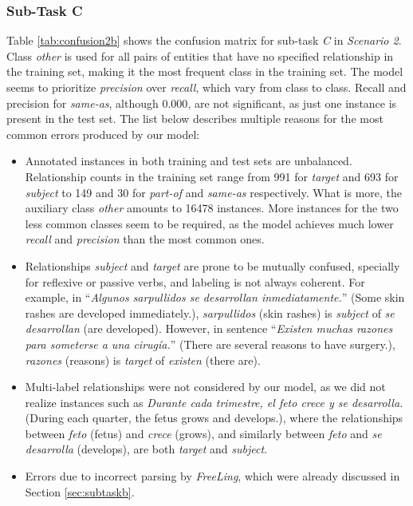 \documentclass[a4paper,11pt,twocolumn,twoside]{article}
\begin{document}
\subsubsection{Sub-Task C}

\label{sec:subtaskc}

Table \ref{tab:confusion2b} shows the confusion matrix for sub-task \emph{C} in \emph{Scenario 2}. Class \emph{other} is used for all pairs of entities that have no specified relationship in the training set, making it the most frequent class in the training set. The model seems to prioritize \emph{precision} over \emph{recall}, which vary from class to class. Recall and precision for \emph{same-as}, although $0.000$, are not significant, as just one instance is present in the test set. The list below describes multiple reasons for the most common errors produced by our model:

\begin{itemize}
    \item Annotated instances in both training and test sets are unbalanced. Relationship counts in the training set range from 991 for \emph{target} and 693 for \emph{subject} to 149 and 30 for \emph{part-of} and \emph{same-as} respectively. What is more, the auxiliary class \emph{other} amounts to 16478 instances. More instances for the two less common classes seem to be required, as the model achieves much lower \emph{recall} and \emph{precision} than the most common ones.
    \item Relationships \emph{subject} and \emph{target} are prone to be mutually confused, specially for reflexive or passive verbs, and labeling is not always coherent. For example, in ``\emph{Algunos sarpullidos se desarrollan inmediatamente.}'' (Some skin rashes are developed immediately.), \emph{sarpullidos} (skin rashes) is \emph{subject} of \emph{se desarrollan} (are developed). However, in sentence ``\emph{Existen muchas razones para someterse a una cirugía.}'' (There are several reasons to have surgery.), \emph{razones} (reasons) is \emph{target} of \emph{existen} (there are).
    \item Multi-label relationships were not considered by our model, as we did not realize instances such as \emph{Durante cada trimestre, el feto crece y se desarrolla.} (During each quarter, the fetus grows and develops.), where the relationships between \emph{feto} (fetus) and \emph{crece} (grows), and similarly between \emph{feto} and \emph{se desarrolla} (develops), are both \emph{target} and \emph{subject}.
    \item Errors due to incorrect parsing by \emph{FreeLing}, which were already discussed in Section \ref{sec:subtaskb}.
\end{itemize}
\end{document}
